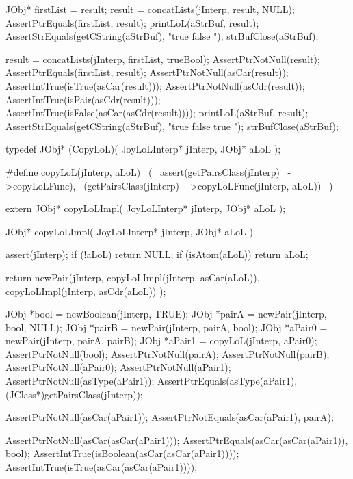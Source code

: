   JObj* firstList = result;
  result = concatLists(jInterp, result, NULL);
  AssertPtrEquals(firstList, result);
  printLoL(aStrBuf, result);
  AssertStrEquals(getCString(aStrBuf), "true false ");
  strBufClose(aStrBuf);
  
  result = concatLists(jInterp, firstList, trueBool);
  AssertPtrNotNull(result);
  AssertPtrEquals(firstList, result);
  AssertPtrNotNull(asCar(result));
  AssertIntTrue(isTrue(asCar(result)));
  AssertPtrNotNull(asCdr(result));
  AssertIntTrue(isPair(asCdr(result)));
  AssertIntTrue(isFalse(asCar(asCdr(result))));
  printLoL(aStrBuf, result);
  AssertStrEquals(getCString(aStrBuf), "true false true ");
  strBufClose(aStrBuf);
\stopCTest
\stopTestCase
\stopTestSuite

\startTestSuite[copyLoL]

\startCHeader
typedef JObj* (CopyLoL)(
  JoyLoLInterp* jInterp,
  JObj* aLoL
);

#define copyLoL(jInterp, aLoL)      \
  (                                 \
    assert(getPairsClass(jInterp)   \
      ->copyLoLFunc),               \
    (getPairsClass(jInterp)         \
      ->copyLoLFunc(jInterp, aLoL)) \
  )
\stopCHeader

\setCHeaderStream{private}
\startCHeader
extern JObj* copyLoLImpl(
  JoyLoLInterp* jInterp,
  JObj* aLoL
);
\stopCHeader
{}

\startCCode
JObj* copyLoLImpl(
  JoyLoLInterp* jInterp,
  JObj* aLoL
) {
  assert(jInterp);
  if (!aLoL) return NULL;
  if (isAtom(aLoL)) return aLoL;

  return newPair(jInterp,
                 copyLoLImpl(jInterp, asCar(aLoL)),
                 copyLoLImpl(jInterp, asCdr(aLoL))
                 );
}
\stopCCode

\startTestCase[should make a correct copy]

\startCTest
  JObj *bool   = newBoolean(jInterp, TRUE);
  JObj *pairA  = newPair(jInterp, bool, NULL);
  JObj *pairB  = newPair(jInterp, pairA, bool);
  JObj *aPair0 = newPair(jInterp, pairA, pairB);
  JObj *aPair1 = copyLoL(jInterp, aPair0);
  AssertPtrNotNull(bool);
  AssertPtrNotNull(pairA);
  AssertPtrNotNull(pairB);
  AssertPtrNotNull(aPair0);
  AssertPtrNotNull(aPair1);
  AssertPtrNotNull(asType(aPair1));
  AssertPtrEquals(asType(aPair1),
    (JClass*)getPairsClass(jInterp));

  AssertPtrNotNull(asCar(aPair1));
  AssertPtrNotEquals(asCar(aPair1), pairA);

  AssertPtrNotNull(asCar(asCar(aPair1)));
  AssertPtrEquals(asCar(asCar(aPair1)), bool);
  AssertIntTrue(isBoolean(asCar(asCar(aPair1))));
  AssertIntTrue(isTrue(asCar(asCar(aPair1))));

